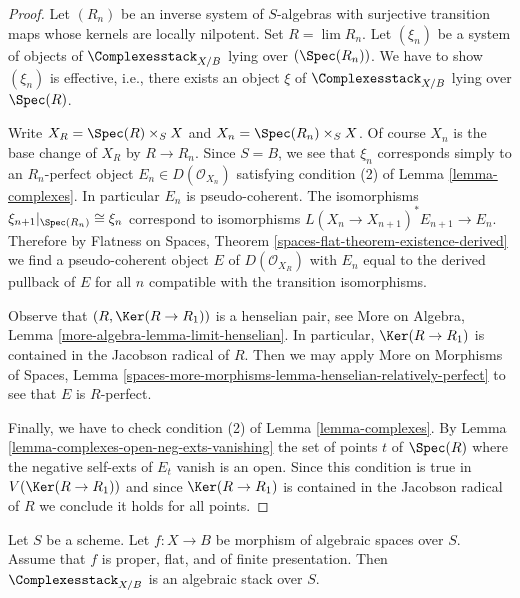 \begin{proof}
Let $(R_n)$ be an inverse system of $S$-algebras with surjective transition
maps whose kernels are locally nilpotent. Set $R = \lim R_n$.
Let $(\xi_n)$ be a system of objects of $\Complexesstack_{X/B}$
lying over $(\Spec(R_n))$. We have to show $(\xi_n)$ is effective, i.e.,
there exists an object $\xi$ of $\Complexesstack_{X/B}$ lying over
$\Spec(R)$.

\medskip\noindent
Write $X_R = \Spec(R) \times_S X$ and $X_n = \Spec(R_n) \times_S X$.
Of course $X_n$ is the base change of $X_R$ by $R \to R_n$. Since $S = B$,
we see that $\xi_n$ corresponds simply to an $R_n$-perfect object
$E_n \in D(\mathcal{O}_{X_n})$ satisfying condition (2) of
Lemma \ref{lemma-complexes}. In particular $E_n$ is pseudo-coherent.
The isomorphisms $\xi_{n + 1}|_{\Spec(R_n)} \cong \xi_n$
correspond to isomorphisms $L(X_n \to X_{n + 1})^*E_{n + 1} \to E_n$.
Therefore by
Flatness on Spaces, Theorem \ref{spaces-flat-theorem-existence-derived}
we find a pseudo-coherent object $E$ of $D(\mathcal{O}_{X_R})$
with $E_n$ equal to the derived pullback of $E$ for all $n$
compatible with the transition isomorphisms.

\medskip\noindent
Observe that $(R, \Ker(R \to R_1))$ is a henselian pair, see
More on Algebra, Lemma \ref{more-algebra-lemma-limit-henselian}.
In particular, $\Ker(R \to R_1)$ is contained in the Jacobson radical of $R$.
Then we may apply More on Morphisms of Spaces, Lemma
\ref{spaces-more-morphisms-lemma-henselian-relatively-perfect}
to see that $E$ is $R$-perfect.

\medskip\noindent
Finally, we have to check condition (2) of Lemma \ref{lemma-complexes}.
By Lemma \ref{lemma-complexes-open-neg-exts-vanishing}
the set of points $t$ of $\Spec(R)$ where the negative self-exts of $E_t$
vanish is an open. Since this condition is true in $V(\Ker(R \to R_1))$
and since $\Ker(R \to R_1)$ is contained in the Jacobson radical of $R$
we conclude it holds for all points.
\end{proof}

\begin{theorem}
\label{theorem-complexes-algebraic}
\begin{reference}
\cite{lieblich-complexes}
\end{reference}
Let $S$ be a scheme. Let $f : X \to B$ be morphism of algebraic spaces
over $S$. Assume that $f$ is proper, flat, and of finite presentation.
Then $\Complexesstack_{X/B}$ is an algebraic stack over $S$.
\end{theorem}

